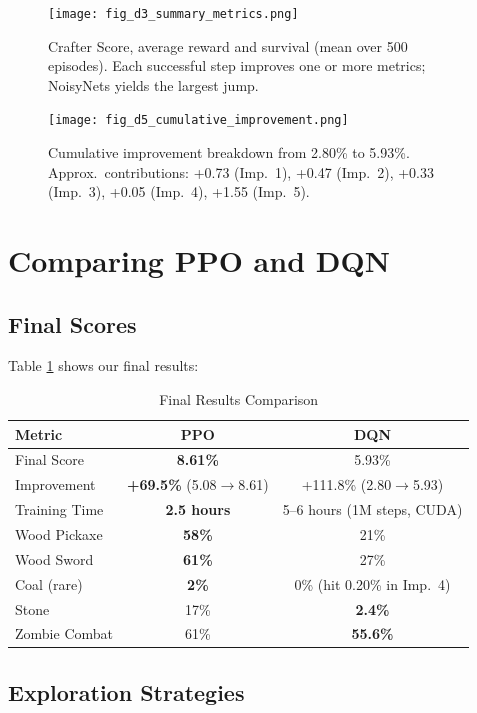 \documentclass[conference]{IEEEtran}
\begin{document}
\begin{figure}[h!]
\centering
\texttt{[image: fig\_d3\_summary\_metrics.png]}
\caption{Crafter Score, average reward and survival (mean over 500 episodes). Each successful step improves one or more metrics; NoisyNets yields the largest jump.}
\label{fig:dqn_summary}
\end{figure}

\begin{figure}[h!]
\centering
\texttt{[image: fig\_d5\_cumulative\_improvement.png]}
\caption{Cumulative improvement breakdown from 2.80\% to 5.93\%. Approx.\ contributions: +0.73 (Imp.~1), +0.47 (Imp.~2), +0.33 (Imp.~3), +0.05 (Imp.~4), +1.55 (Imp.~5).}
\label{fig:dqn_breakdown}
\end{figure}


\section{Comparing PPO and DQN}

\subsection{Final Scores}

Table \ref{tab:results} shows our final results:

\begin{table}[h]
\centering
\caption{Final Results Comparison}
\label{tab:results}
\begin{tabular}{lcc}
\toprule
\textbf{Metric} & \textbf{PPO} & \textbf{DQN} \\
\midrule
Final Score & \textbf{8.61\%} & 5.93\% \\
Improvement & \textbf{+69.5\%} (5.08$\rightarrow$8.61) & +111.8\% (2.80$\rightarrow$5.93) \\
Training Time & \textbf{2.5 hours} & 5--6 hours (1M steps, CUDA) \\
Wood Pickaxe & \textbf{58\%} & 21\% \\
Wood Sword & \textbf{61\%} & 27\% \\
Coal (rare) & \textbf{2\%} & 0\% \footnotesize{(hit 0.20\% in Imp.~4)} \normalsize \\
Stone & 17\% & \textbf{2.4\%} \\
Zombie Combat & 61\% & \textbf{55.6\%} \\
\bottomrule
\end{tabular}
\end{table}

\subsection{Exploration Strategies}
\end{document}
